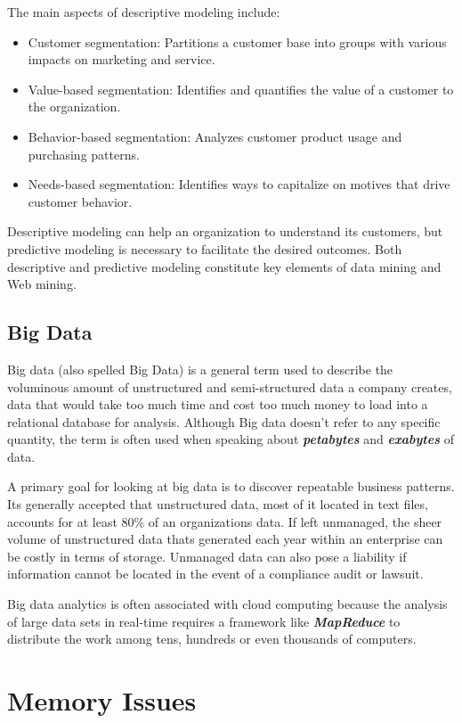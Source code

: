The main aspects of descriptive modeling include:

\begin{itemize}
\item Customer segmentation: Partitions a customer base into groups with various impacts on marketing and service.
\item Value-based segmentation: Identifies and quantifies the value of a customer to the organization.
\item Behavior-based segmentation: Analyzes customer product usage and purchasing patterns.
\item Needs-based segmentation: Identifies ways to capitalize on motives that drive customer behavior.
\end{itemize}
Descriptive modeling can help an organization to understand its customers, but predictive modeling is necessary to facilitate the desired outcomes. Both descriptive and predictive modeling constitute key elements of data mining and Web mining.

\subsection{Big Data}
Big data (also spelled Big Data) is a general term used to describe the voluminous amount of unstructured and semi-structured data a company creates, data that would take too much time and cost too much money to load into a relational database for analysis. Although Big data doesn't refer to any specific quantity, the term is often used when speaking about \textbf{\emph{petabytes}} and \textbf{\emph{exabytes}} of data.


A primary goal for looking at big data is to discover repeatable business patterns. Its generally accepted that unstructured data, most of it located in text files, accounts for at least $80\%$ of an organizations data. If left unmanaged, the sheer volume of unstructured data thats generated each year within an enterprise can be costly in terms of storage. Unmanaged data can also pose a liability if information cannot be located in the event of a compliance audit or lawsuit.

Big data analytics is often associated with cloud computing because the analysis of large data sets in real-time requires a framework like \textbf{\emph{MapReduce}} to distribute the work among tens, hundreds or even thousands of computers.

\section{Memory Issues}
